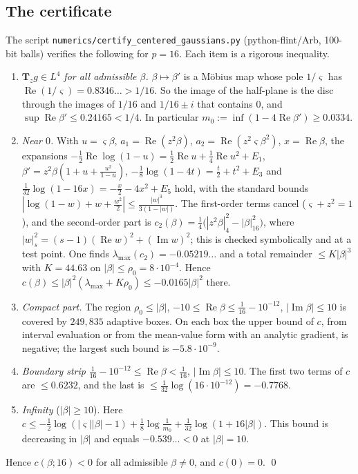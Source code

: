 \documentclass[11pt]{amsart}
\theoremstyle{definition}
\newcommand{\Rea}{\operatorname{Re}}
\newcommand{\Ima}{\operatorname{Im}}
\newcommand{\bT}{\mathbf{T}}
\begin{document}
\subsection{The certificate}
The script \texttt{numerics/\allowbreak certify\_centered\_gaussians.py} (python-flint/Arb, 100-bit balls) verifies the
following for $p=16$. Each item is a rigorous inequality.
\begin{enumerate}[label=(\arabic*)]
\item \emph{$\bT_zg\in L^4$ for all admissible $\beta$.} $\beta\mapsto\beta'$ is a M\"obius map whose pole
$1/\varsigma$ has $\Rea(1/\varsigma)=0.8346\ldots>1/16$. So the image of the half-plane is the disc through the
images of $1/16$ and $1/16\pm i$ that contains $0$, and $\sup\Rea\beta'\le0.24165<1/4$. In particular
$m_0:=\inf(1-4\Rea\beta')\ge0.0334$.
\item \emph{Near $0$.} With $u=\varsigma\beta$, $a_1=\Rea(z^2\beta)$, $a_2=\Rea(z^2\varsigma\beta^2)$,
$x=\Rea\beta$, the expansions
$-\frac12\Rea\log(1-u)=\frac12\Rea u+\frac14\Rea u^2+E_1$,
$\beta'=z^2\beta(1+u+\frac{u^2}{1-u})$,
$-\frac18\log(1-4t)=\frac t2+t^2+E_3$ and
$\frac1{32}\log(1-16x)=-\frac x2-4x^2+E_5$
hold, with the standard bounds $|\log(1-w)+w+\frac{w^2}2|\le\frac{|w|^3}{3(1-|w|)}$. The first-order terms cancel
($\varsigma+z^2=1$), and the second-order part is
$c_2(\beta)=\frac14\big(|z^2\beta|_4^2-|\beta|_{16}^2\big)$, where $|w|_s^2=(s-1)(\Rea w)^2+(\Ima w)^2$; this is
checked symbolically and at a test point. One finds $\lambda_{\max}(c_2)=-0.05219\ldots$ and a total remainder
$\le K|\beta|^3$ with $K=44.63$ on $|\beta|\le\rho_0=8\cdot10^{-4}$. Hence
$c(\beta)\le|\beta|^2(\lambda_{\max}+K\rho_0)\le-0.0165|\beta|^2$ there.
\item \emph{Compact part.} The region $\rho_0\le|\beta|$, $-10\le\Rea\beta\le\frac1{16}-10^{-12}$,
$|\Ima\beta|\le10$ is covered by $249{,}835$ adaptive boxes. On each box the upper bound of $c$, from interval
evaluation or from the mean-value form with an analytic gradient, is negative; the largest such bound is
$-5.8\cdot10^{-9}$.
\item \emph{Boundary strip} $\frac1{16}-10^{-12}\le\Rea\beta<\frac1{16}$, $|\Ima\beta|\le10$. The first two terms
of $c$ are $\le0.6232$, and the last is $\le\frac1{32}\log(16\cdot10^{-12})=-0.7768$.
\item \emph{Infinity} ($|\beta|\ge10$). Here
$c\le-\frac12\log(|\varsigma||\beta|-1)+\frac18\log\frac1{m_0}+\frac1{32}\log(1+16|\beta|)$. This bound is
decreasing in $|\beta|$ and equals $-0.539\ldots<0$ at $|\beta|=10$.
\end{enumerate}
Hence $c(\beta;16)<0$ for all admissible $\beta\ne0$, and $c(0)=0$. \qed
\end{document}
